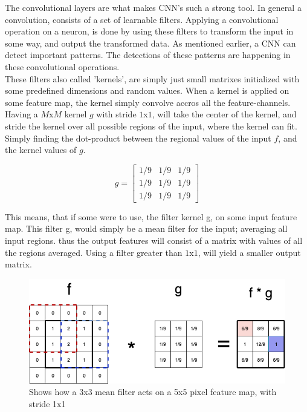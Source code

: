 The convolutional layers are what makes CNN's such a strong tool. In general a convolution, consists of a set of learnable filters. Applying a convolutional operation on a neuron, is done by using these filters to transform the input in some way, and output the transformed data. As mentioned earlier, a CNN can detect important patterns. The detections of these patterns are happening in these convolutional operations.\\

\noindent
These filters also called 'kernels', are simply just small matrixes initialized with some predefined dimensions and random values. When a kernel is applied on some feature map, the kernel simply convolve accros all the feature-channels.\\

\noindent
Having a $M$x$M$ kernel $g$ with stride $1$x$1$, will take the center of the kernel, and stride the kernel over all possible regions of the input, where the kernel can fit. Simply finding the dot-product between the regional values of the input $f$, and the kernel values of $g$.

$$ g = \begin{bmatrix}
1/9 & 1/9 & 1/9 \\
1/9 & 1/9 & 1/9 \\
1/9 & 1/9 & 1/9
\end{bmatrix}
$$

\noindent
This means, that if some were to use, the filter kernel g, on some input feature map. This filter g, would simply be a mean filter for the input; averaging all input regions. thus the output features will consist of a matrix with values of all the regions averaged. Using a filter greater than $1$x$1$, will yield a smaller output matrix.

\begin{figure}[!ht]
  \centering
  \includegraphics[scale=0.4]{latex/IMGs/conv1.png}
  \caption{Shows how a 3x3 mean filter acts on a 5x5 pixel feature map, with stride 1x1}\label{Baseline:before}
\end{figure}

